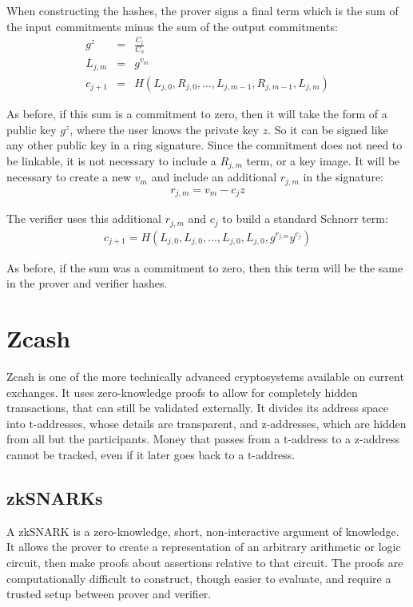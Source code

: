 \documentclass{article}
\begin{document}
When constructing the hashes, the prover signs a final term which is the sum of the input commitments minus the sum of the output commitments:
\begin{eqnarray}
  g^z &=& \frac{C_i}{C_o}\\
  L_{j,m} &=& g^{v_m}\\
  c_{j+1} &=& H(L_{j,0}, R_{j,0}, ... , L_{j,m-1}, R_{j, m-1}, L_{j,m})
\end{eqnarray}

As before, if this sum is a commitment to zero, then it will take the form of a public key $g^z$, where the user knows the private key $z$.  So it can be signed like any other public key in a ring signature.  Since the commitment does not need to be linkable, it is not necessary to include a $R_{j,m}$ term, or a key image.  It will be necessary to create a new $v_m$ and include an additional $r_{j,m}$ in the signature:
\begin{eqnarray}
  r_{j,m} = v_m - c_j z
\end{eqnarray}

The verifier uses this additional $r_{j,m}$ and $c_j$ to build a standard Schnorr term:
\begin{eqnarray}
  c_{j+1} = H(L_{j,0}, L_{j,0}, ... , L_{j,0}, L_{j,0}, g^{r_{j,m}} y^{c_j})
\end{eqnarray}

As before, if the sum was a commitment to zero, then this term will be the same in the prover and verifier hashes.



\section{Zcash}

Zcash is one of the more technically advanced cryptosystems available on current exchanges.  It uses zero-knowledge proofs to allow for completely hidden transactions, that can still be validated externally.  It divides its address space into t-addresses, whose details are transparent, and z-addresses, which are hidden from all but the participants.  Money that passes from a t-address to a z-address cannot be tracked, even if it later goes back to a t-address.


\subsection{zkSNARKs}

A zkSNARK is a zero-knowledge, short, non-interactive argument of knowledge.  It allows the prover to create a representation of an arbitrary arithmetic or logic circuit, then make proofs about assertions relative to that circuit.  The proofs are computationally difficult to construct, though easier to evaluate, and require a trusted setup between prover and verifier.
\end{document}
